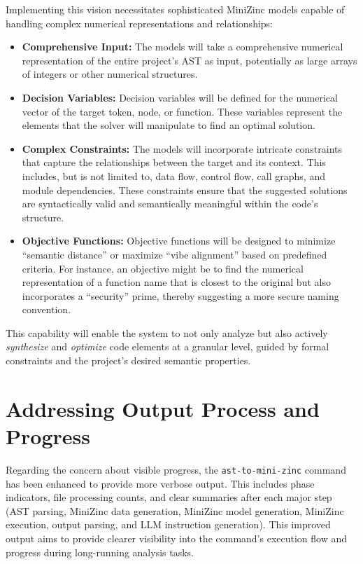\documentclass{article}
\begin{document}
Implementing this vision necessitates sophisticated MiniZinc models capable of handling complex numerical representations and relationships:

\begin{itemize}
    \item \textbf{Comprehensive Input:} The models will take a comprehensive numerical representation of the entire project's AST as input, potentially as large arrays of integers or other numerical structures.
    \item \textbf{Decision Variables:} Decision variables will be defined for the numerical vector of the target token, node, or function. These variables represent the elements that the solver will manipulate to find an optimal solution.
    \item \textbf{Complex Constraints:} The models will incorporate intricate constraints that capture the relationships between the target and its context. This includes, but is not limited to, data flow, control flow, call graphs, and module dependencies. These constraints ensure that the suggested solutions are syntactically valid and semantically meaningful within the code's structure.
    \item \textbf{Objective Functions:} Objective functions will be designed to minimize ``semantic distance'' or maximize ``vibe alignment'' based on predefined criteria. For instance, an objective might be to find the numerical representation of a function name that is closest to the original but also incorporates a ``security'' prime, thereby suggesting a more secure naming convention.
\end{itemize}

This capability will enable the system to not only analyze but also actively \textit{synthesize} and \textit{optimize} code elements at a granular level, guided by formal constraints and the project's desired semantic properties.

\section{Addressing Output Process and Progress}

Regarding the concern about visible progress, the \texttt{ast-to-mini-zinc} command has been enhanced to provide more verbose output. This includes phase indicators, file processing counts, and clear summaries after each major step (AST parsing, MiniZinc data generation, MiniZinc model generation, MiniZinc execution, output parsing, and LLM instruction generation). This improved output aims to provide clearer visibility into the command's execution flow and progress during long-running analysis tasks.
\end{document}
